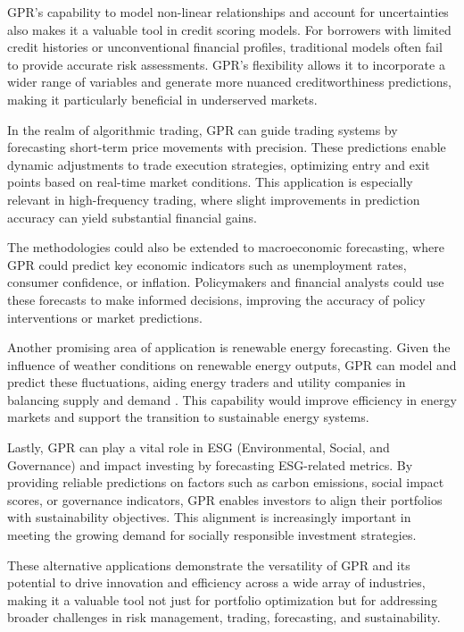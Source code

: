 GPR's capability to model non-linear relationships and account for uncertainties also makes it a valuable tool in credit scoring models. For borrowers with limited credit histories or unconventional financial profiles, traditional models often fail to provide accurate risk assessments. \ac{GPR}'s flexibility allows it to incorporate a wider range of variables and generate more nuanced creditworthiness predictions, making it particularly beneficial in underserved markets.

In the realm of algorithmic trading, GPR can guide trading systems by forecasting short-term price movements with precision. These predictions enable dynamic adjustments to trade execution strategies, optimizing entry and exit points based on real-time market conditions. This application is especially relevant in high-frequency trading, where slight improvements in prediction accuracy can yield substantial financial gains.

The methodologies could also be extended to macroeconomic forecasting, where GPR could predict key economic indicators such as unemployment rates, consumer confidence, or inflation. Policymakers and financial analysts could use these forecasts to make informed decisions, improving the accuracy of policy interventions or market predictions.

Another promising area of application is renewable energy forecasting. Given the influence of weather conditions on renewable energy outputs, GPR can model and predict these fluctuations, aiding energy traders and utility companies in balancing supply and demand \cite{en13205509}. This capability would improve efficiency in energy markets and support the transition to sustainable energy systems.

Lastly, GPR can play a vital role in ESG (Environmental, Social, and Governance) and impact investing by forecasting ESG-related metrics. By providing reliable predictions on factors such as carbon emissions, social impact scores, or governance indicators, GPR enables investors to align their portfolios with sustainability objectives. This alignment is increasingly important in meeting the growing demand for socially responsible investment strategies.

These alternative applications demonstrate the versatility of GPR and its potential to drive innovation and efficiency across a wide array of industries, making it a valuable tool not just for portfolio optimization but for addressing broader challenges in risk management, trading, forecasting, and sustainability.

